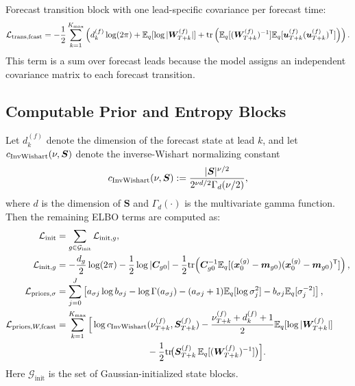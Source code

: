 Forecast transition block with one lead-specific covariance per forecast time:
\begin{align}
\mathcal{L}_{\text{trans,fcast}}
= -\frac12\sum_{k=1}^{K_{\max}}\left(
d_k^{(f)}\log(2\pi)
+\mathbb{E}_q[\log|\bm W_{T+k}^{(f)}|]
+\mathrm{tr}\left(\mathbb{E}_q[(\bm W_{T+k}^{(f)})^{-1}]
\mathbb{E}_q[\bm u_{T+k}^{(f)}(\bm u_{T+k}^{(f)})^{\mathsf{T}}]\right)
\right).
\label{eq:elbo_trans_fcast_block}
\end{align}
This term is a sum over forecast leads because the model assigns an independent
covariance matrix to each forecast transition.

\subsection{Computable Prior and Entropy Blocks}
Let $d_k^{(f)}$
denote the dimension of the forecast state at lead $k$, and let
$c_{\mathrm{InvWishart}}(\nu,\bm S)$ denote the inverse-Wishart normalizing constant
\begin{align}
c_{\mathrm{InvWishart}}(\nu,\bm S)
:=
\frac{|\bm S|^{\nu/2}}{2^{\nu d/2}\Gamma_d(\nu/2)},
\label{eq:iw_norm_const}
\end{align}
where $d$ is the dimension of $\bm S$ and $\Gamma_d(\cdot)$ is the multivariate gamma function.
Then the remaining ELBO terms are computed as:
\begin{align}
\mathcal{L}_{\text{init}}
&=
\sum_{g\in\mathcal G_{\mathrm{init}}}
\mathcal{L}_{\text{init},g},
\label{eq:elbo_init_block}\\
\mathcal{L}_{\text{init},g}
&=
-\frac{d_g}{2}\log(2\pi)
-\frac12\log|\bm C_{g0}|
-\frac12\tr\!\left(
\bm C_{g0}^{-1}\E_q[(\bm x_{0}^{(g)}-\bm m_{g0})(\bm x_{0}^{(g)}-\bm m_{g0})^\T]
\right), \label{eq:elbo_init_block_g}\\
\mathcal{L}_{\text{priors},\sigma}
&=
\sum_{j=0}^{J}
\left[
a_{\sigma j}\log b_{\sigma j}-\log\Gamma(a_{\sigma j})
-(a_{\sigma j}+1)\E_q[\log \sigma_j^2]
-b_{\sigma j}\E_q[\sigma_j^{-2}]
\right], \label{eq:elbo_prior_sigma_block}\\
\mathcal{L}_{\text{priors},W,\mathrm{fcast}}
&=
\sum_{k=1}^{K_{\max}}\Big[
\log c_{\IW}(\nu_{T+k}^{(f)},\bm S_{T+k}^{(f)})
-\frac{\nu_{T+k}^{(f)}+d_k^{(f)}+1}{2}\E_q[\log|\bm W_{T+k}^{(f)}|] \nonumber\\
&\hspace{10em}
-\frac12\tr\!\big(\bm S_{T+k}^{(f)}\,\E_q[(\bm W_{T+k}^{(f)})^{-1}]\big)
\Big]. \label{eq:elbo_prior_W_fcast_block}
\end{align}
Here $\mathcal G_{\mathrm{init}}$ is the set of Gaussian-initialized state blocks.
